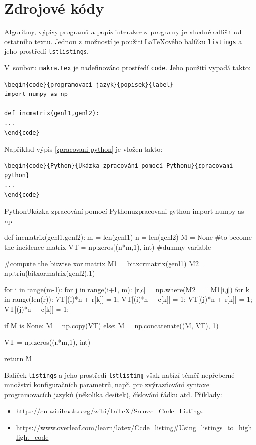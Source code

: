 \section{Zdrojové kódy}
Algoritmy, výpisy programů a popis interakce s~programy je vhodné odlišit od ostatního textu. Jednou z~možností je použití {\LaTeX}o\-vé\-ho balíčku \texttt{listings} a jeho prostředí \texttt{lstlistings}.

V~souboru \texttt{makra.tex} je nadefinováno prostředí \texttt{code}. Jeho použití vypadá takto:
\begin{verbatim}
\begin{code}{programovací-jazyk}{popisek}{label}
import numpy as np
    
def incmatrix(genl1,genl2):
...
\end{code}
\end{verbatim}

\noindent
Například výpis \ref{zpracovani-python} je vložen takto:
\begin{verbatim}
\begin{code}{Python}{Ukázka zpracování pomocí Pythonu}{zpracovani-python}
...
\end{code}
\end{verbatim}

\begin{code}{Python}{Ukázka zpracování pomocí Pythonu}{zpracovani-python}
import numpy as np
    
def incmatrix(genl1,genl2):
    m = len(genl1)
    n = len(genl2)
    M = None #to become the incidence matrix
    VT = np.zeros((n*m,1), int)  #dummy variable
    
    #compute the bitwise xor matrix
    M1 = bitxormatrix(genl1)
    M2 = np.triu(bitxormatrix(genl2),1) 

    for i in range(m-1):
        for j in range(i+1, m):
            [r,c] = np.where(M2 == M1[i,j])
            for k in range(len(r)):
                VT[(i)*n + r[k]] = 1;
                VT[(i)*n + c[k]] = 1;
                VT[(j)*n + r[k]] = 1;
                VT[(j)*n + c[k]] = 1;
                
                if M is None:
                    M = np.copy(VT)
                else:
                    M = np.concatenate((M, VT), 1)
                
                VT = np.zeros((n*m,1), int)
    
    return M
\end{code}

Balíček \texttt{listings} a jeho prostředí \texttt{lstlisting} však nabízí téměř nepřeberné množství konfiguračních parametrů, např. pro zvýrazňování syntaxe programovacích jazyků (několika desítek), číslování řádku atd. Příklady:
\begin{itemize}
\item \url{https://en.wikibooks.org/wiki/LaTeX/Source_Code_Listings}
\item \url{https://www.overleaf.com/learn/latex/Code_listing#Using_listings_to_highlight_code}
\end{itemize}


